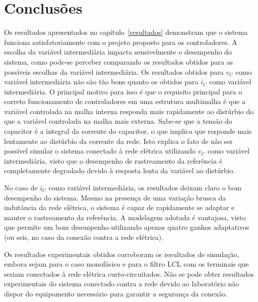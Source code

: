 
\chapter{Conclusões}\label{conclusoes}

  Os resultados apresentados no capítulo~\ref{resultados} demonstram que o sistema funciona satisfatoriamente com o projeto proposto para os controladores. A escolha da variável intermediária impacta sensivelmente o desempenho do sistema, como pode-se perceber comparando os resultados obtidos para as possíveis escolhas da variável intermediária. Os resultados obtidos para $v_C$ como variável intermediária não são tão bons quanto os obtidos para $i_C$ como variável intermediária. O principal motivo para isso é que o requisito principal para o correto funcionamento de controladores em uma estrutura multimalha é que a variável controlada na malha interna responda mais rapidamente ao distúrbio do que a variável controlada na malha mais externa. Sabe-se que a tensão do capacitor é a integral da corrente do capacitor, o que implica que responde mais lentamente ao distúrbio da corrente da rede. Isto explica o fato de não ser possível simular o sistema conectado à rede elétrica utilizando $v_C$ como variável intermediária, visto que o desempenho de rastreamento da referência é completamente degradado devido à resposta lenta da variável ao distúrbio.

  No caso de $i_C$ como variável intermediária, os resultados deixam claro o bom desempenho do sistema. Mesmo na presença de uma variação brusca da indutância da rede elétrica, o sistema é capaz de rapidamente se adaptar e manter o rastreamento da referência. A modelagem adotada é vantajosa, visto que permite um bom desempenho utilizando apenas quatro ganhos adaptativos (ou seis, no caso da conexão contra a rede elétrica).

  Os resultados experimentais obtidos corroboram os resultados de simulação, embora sejam para o caso monofásico e para o filtro LCL com os terminais que seriam conectados à rede elétrica curto-circuitados. Não se pode obter resultados experimentais do sistema conectado contra a rede devido ao laboratório não dispor do equipamento necessário para garantir a segurança da conexão.

